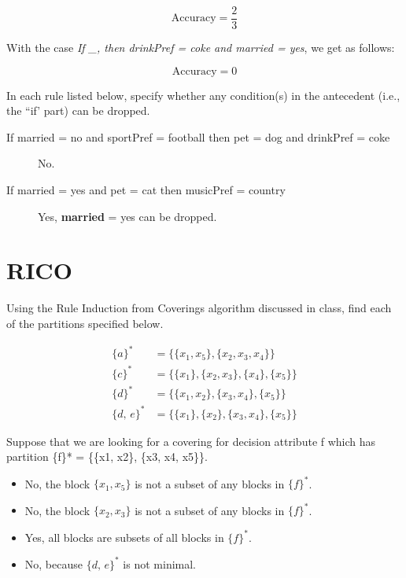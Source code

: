 \documentclass[12pt]{scrartcl}
\begin{document}
\begin{equation*}
    \text{Accuracy} = \frac{2}{3}
\end{equation*}

With the case \textit{If \_, then drinkPref = coke and married = yes}, we get as follows:

\begin{equation*}
    \text{Accuracy} = 0
\end{equation*}

\begin{statement}
    In each rule listed below, specify whether any condition(s) in the antecedent (i.e., the “if’ part) can be dropped.
\end{statement}

\begin{description}
    \item[If married = no and sportPref = football then pet = dog and drinkPref = coke] No.
    \item[If married = yes and pet = cat then musicPref = country] Yes, \textbf{married} = yes can be dropped.
\end{description}

\section{RICO}
\begin{statement}
    Using the Rule Induction from Coverings algorithm discussed in class, find each of the partitions specified below.
\end{statement}
\begin{align*}
    {\{a\}}^*      & = \{ \{x_1, x_5\}, \{x_2, x_3, x_4\} \} \\
    {\{c\}}^*      & = \{ \{x_1\}, \{x_2, x_3\}, \{x_4\}, \{x_5\}  \} \\
    {\{d\}}^*      & = \{ \{x_1, x_2\}, \{x_3, x_4\}, \{x_5\} \} \\
    {\{d,\, e\}}^* & = \{ \{x_1\}, \{x_2\}, \{x_3, x_4\}, \{x_5\} \}
\end{align*}

\begin{statement}
    Suppose that we are looking for a covering for decision attribute f which has partition \{f\}* = \{\{x1, x2\}, \{x3, x4, x5\}\}.
\end{statement}

\begin{itemize}
    \item No, the block $\{x_1, x_5\}$ is not a subset of any blocks in ${\{f\}}^*$.
    \item No, the block $\{x_2, x_3\}$ is not a subset of any blocks in ${\{f\}}^*$.
    \item Yes, all blocks are subsets of all blocks in ${\{f\}}^*$.
    \item No, because ${\{d,\, e\}}^*$ is not minimal.
\end{itemize}
\end{document}
